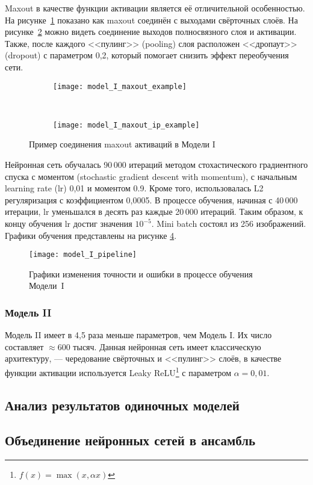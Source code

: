 Maxout в качестве функции активации является её отличительной особенностью.
На рисунке~\ref{fig:model_I_maxout_example} показано как maxout соединён с выходами свёрточных слоёв. На
рисунке~\ref{fig:model_I_maxout_ip_example} можно видеть соединение выходов полносвязного слоя и активации.
Также, после каждого <<пулинг>> (pooling) слоя расположен <<дропаут>> (dropout) с параметром 0,2, который помогает
снизить эффект переобучения сети.
\begin{figure}[h]
    \centering
    \begin{subfigure}[b]{0.5\textwidth}
        \texttt{[image: model\_I\_maxout\_example]}
        \vspace*{0.13cm}
        \subcaption{}
        \label{fig:model_I_maxout_example}
    \end{subfigure}~
    \begin{subfigure}[b]{0.5\textwidth}
        \texttt{[image: model\_I\_maxout\_ip\_example]}
        \subcaption{}
        \label{fig:model_I_maxout_ip_example}
    \end{subfigure}
    \caption{Пример соединения maxout активаций в Модели I}
    \label{fig:maxout_model_I}
\end{figure}

Нейронная сеть обучалась 90\,000 итераций методом стохастического градиентного спуска с моментом (stochastic gradient descent with momentum),
с начальным learning rate (lr) 0,01 и моментом 0.9. Кроме того, использовалась L2 регуляризация с коэффициентом 0,0005.
В процессе обучения, начиная с 40\,000 итерации, lr уменьшался в десять раз каждые 20\,000 итераций.
Таким образом, к концу обучения lr достиг значения $10^{-5}$. Mini batch состоял из 256 изображений. Графики обучения представлены
на рисунке \ref{fig:model_I_pipeline}.

\begin{figure}[H]
    \centering
    \texttt{[image: model\_I\_pipeline]}
    \caption{Графики изменения точности и ошибки в процессе обучения Модели~I}
    \label{fig:model_I_pipeline}
\end{figure}

\subsubsection{Модель II}
Модель II имеет в 4,5 раза меньше параметров, чем Модель I. Их число составляет $\approx600$ тысяч.
Данная нейронная сеть имеет классическую архитектуру, --- чередование свёрточных и <<пулинг>> слоёв, в качестве
функции активации используется Leaky ReLU\footnote{$f(x) = \max(x, \alpha x)$} с параметром $\alpha = 0,01$.
\subsection{Анализ результатов одиночных моделей}
\subsection{Объединение нейронных сетей в ансамбль}